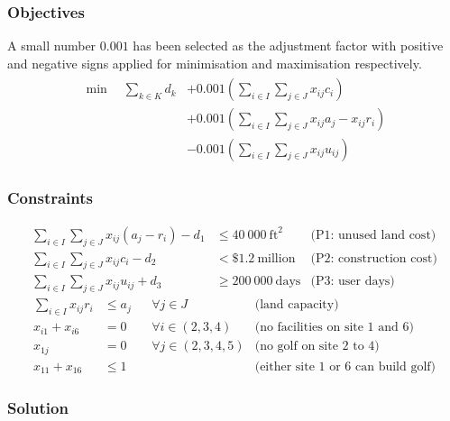 \documentclass[a4paper,11pt]{article}
\begin{document}
\subsubsection{Objectives}
A small number $0.001$ has been selected as the adjustment factor with positive and negative signs applied for minimisation and maximisation respectively.
\begin{align}
	\begin{split}
	\min \quad \sum_{k\in K}d_k &+ 0.001(\sum_{i\in I} \sum_{j\in J} x_{ij}c_i)\\
		&+ 0.001(\sum_{i\in I} \sum_{j\in J} x_{ij}a_j-x_{ij}r_i)\\
		&- 0.001(\sum_{i\in I} \sum_{j\in J} x_{ij}u_{ij})	
	\end{split}
\end{align}

\subsubsection{Constraints}
\begin{align}
\sum_{i\in I} \sum_{j\in J} x_{ij}(a_j-r_i) -d_1& \leq 40\ 000\ \text{ft}^2  & \text{(P1: unused land cost)} \\
 \sum_{i\in I} \sum_{j\in J} x_{ij}c_i - d_2& < \$1.2\  \text{million} & \text{(P2: construction cost)} \\
\sum_{i\in I} \sum_{j\in J} x_{ij}u_{ij} +d_3 & \geq 200\ 000\ \text{days}  & \text{(P3: user days)} 
\end{align}
\begin{align}
\sum_{i\in I} x_{ij}r_i &\leq a_j && \forall j\in J & \text{(land capacity)}        \\
x_{i1}+x_{i6} &= 0  && \forall i \in (2,3,4)  & \text{(no facilities on site 1 and 6)}\\
x_{1j} &= 0 && \forall j\in (2,3,4,5) & \text{(no golf on site 2 to 4)}\\
x_{11} + x_{16} &\leq 1 && & \text{(either site 1 or 6 can build golf)}
\end{align}

\subsubsection{Solution}
\end{document}
